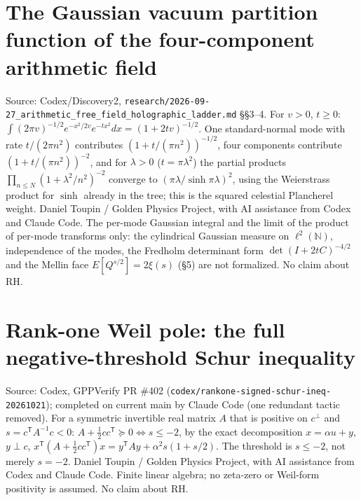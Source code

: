 \documentclass{report}
\theoremstyle{definition}
\begin{document}
\begin{itemize}
\begin{itemize}
\section{The Gaussian vacuum partition function of the four-component arithmetic field}
Source: Codex/Discovery2, \texttt{research/2026-09-27\_arithmetic\_free\_field\_holographic\_ladder.md} \S\S3--4. For $v>0$, $t\ge0$: $\int(2\pi v)^{-1/2}e^{-x^2/2v}e^{-tx^2}dx=(1+2tv)^{-1/2}$. One standard-normal mode with rate $t/(2\pi n^2)$ contributes $(1+t/(\pi n^2))^{-1/2}$, four components contribute $(1+t/(\pi n^2))^{-2}$, and for $\lambda>0$ ($t=\pi\lambda^2$) the partial products
$\prod_{n\le N}(1+\lambda^2/n^2)^{-2}$ converge to $(\pi\lambda/\sinh\pi\lambda)^2$, using the Weierstrass product for $\sinh$ already in the tree; this is the squared celestial Plancherel weight.
Daniel Toupin / Golden Physics Project, with AI assistance from Codex and Claude Code. The per-mode Gaussian integral and the limit of the product of per-mode transforms only: the cylindrical Gaussian measure on $\ell^2(\mathbb N)$, independence of the modes, the Fredholm determinant form $\det(I+2tC)^{-4/2}$ and the Mellin face $E[Q^{s/2}]=2\xi(s)$ (\S5) are not formalized. No claim about RH.
\section{Rank-one Weil pole: the full negative-threshold Schur inequality}
Source: Codex, GPPVerify PR \#402 (\texttt{codex/rankone-signed-schur-ineq-20261021}); completed on current main by Claude Code (one redundant tactic removed). For a symmetric invertible real matrix $A$ that is positive on $c^\perp$ and $s=c^{\mathsf T}A^{-1}c<0$:
$A+\tfrac12cc^{\mathsf T}\succeq0\iff s\le-2$, by the exact decomposition $x=\alpha u+y$, $y\perp c$, $x^{\mathsf T}(A+\tfrac12cc^{\mathsf T})x=y^{\mathsf T}Ay+\alpha^2s(1+s/2)$. The threshold is $s\le-2$, not merely $s=-2$.
Daniel Toupin / Golden Physics Project, with AI assistance from Codex and Claude Code. Finite linear algebra; no zeta-zero or Weil-form positivity is assumed. No claim about RH.


\end{itemize}
\end{itemize}
\end{document}
